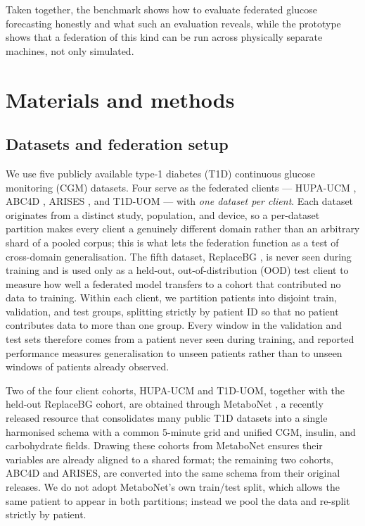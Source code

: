 \documentclass[10pt,letterpaper]{article}
\begin{document}
Taken together, the benchmark shows how to evaluate federated glucose
forecasting honestly and what such an evaluation reveals, while the prototype
shows that a federation of this kind can be run across physically separate
machines, not only simulated.

\section*{Materials and methods}

\subsection*{Datasets and federation setup}

We use five publicly available type-1 diabetes (T1D) continuous glucose
monitoring (CGM) datasets. Four serve as the federated clients --- HUPA-UCM
\cite{hidalgo2024hupaucm}, ABC4D \cite{abc4d_nct}, ARISES \cite{zhu2022arises},
and T1D-UOM \cite{alsuhaymi2025t1duom} --- with \emph{one dataset per client}. Each dataset
originates from a distinct study, population, and device, so a per-dataset
partition makes every client a genuinely different domain rather than an
arbitrary shard of a pooled corpus; this is what lets the federation function as
a test of cross-domain generalisation. The fifth dataset, ReplaceBG
\cite{aleppo2017replacebg}, is never seen during training and is used only as a
held-out, out-of-distribution (OOD) test client to measure how well a federated model transfers to a cohort that
contributed no data to training. Within each client, we partition patients
into disjoint train, validation, and test groups, splitting strictly by
patient ID so that no patient contributes data to more than one group. Every
window in the validation and test sets therefore comes from a patient never
seen during training, and reported performance measures generalisation to
unseen patients rather than to unseen windows of patients already observed.

Two of the four client cohorts, HUPA-UCM and T1D-UOM, together with the held-out
ReplaceBG cohort, are obtained through MetaboNet
\cite{wolff2026metabonet}, a recently released resource that consolidates many
public T1D datasets into a single harmonised schema with a common 5-minute grid
and unified CGM, insulin, and carbohydrate fields. Drawing these cohorts from
MetaboNet ensures their variables are already aligned to a shared format; the
remaining two cohorts, ABC4D and ARISES, are converted into the same schema
from their original releases. We do not adopt MetaboNet's own train/test split,
which allows the same patient to appear in both partitions; instead we pool the
data and re-split strictly by patient.
\end{document}
